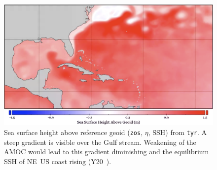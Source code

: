 
\begin{figure}
\includegraphics[width=\linewidth]{images/example-images/zos-image.png}
\caption{Sea surface height above reference geoid (\texttt{zos}, $\eta$, SSH)
from \texttt{tyr}.
A steep gradient is visible over the Gulf stream. Weakening of the AMOC
would lead to this gradient diminishing and the equilibrium SSH of NE~US coast
rising (Y20~\cite{ZannaPreprint}).}
\label{fig:zos}
\end{figure}
